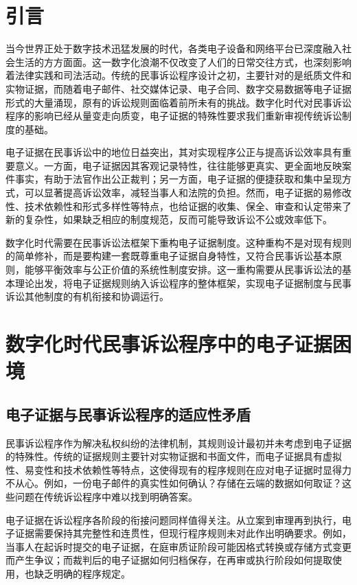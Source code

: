 \section{引言}

当今世界正处于数字技术迅猛发展的时代，各类电子设备和网络平台已深度融入社会生活的方方面面。这一数字化浪潮不仅改变了人们的日常交往方式，也深刻影响着法律实践和司法活动。传统的民事诉讼程序设计之初，主要针对的是纸质文件和实物证据，而随着电子邮件、社交媒体记录、电子合同、数字交易数据等电子证据形式的大量涌现，原有的诉讼规则面临着前所未有的挑战。数字化时代对民事诉讼程序的影响已经从量变走向质变，电子证据的特殊性要求我们重新审视传统诉讼制度的基础。

电子证据在民事诉讼中的地位日益突出，其对实现程序公正与提高诉讼效率具有重要意义。一方面，电子证据因其客观记录特性，往往能够更真实、更全面地反映案件事实，有助于法官作出公正裁判；另一方面，电子证据的便捷获取和集中呈现方式，可以显著提高诉讼效率，减轻当事人和法院的负担。然而，电子证据的易修改性、技术依赖性和形式多样性等特点，也给证据的收集、保全、审查和认定带来了新的复杂性，如果缺乏相应的制度规范，反而可能导致诉讼不公或效率低下。

数字化时代需要在民事诉讼法框架下重构电子证据制度。这种重构不是对现有规则的简单修补，而是要构建一套既尊重电子证据自身特性，又符合民事诉讼基本原则，能够平衡效率与公正价值的系统性制度安排。这一重构需要从民事诉讼法的基本理论出发，将电子证据规则纳入诉讼程序的整体框架，实现电子证据制度与民事诉讼其他制度的有机衔接和协调运行。

\section{数字化时代民事诉讼程序中的电子证据困境}

\subsection{电子证据与民事诉讼程序的适应性矛盾}

民事诉讼程序作为解决私权纠纷的法律机制，其规则设计最初并未考虑到电子证据的特殊性。传统的证据规则主要针对实物证据和书面文件，而电子证据具有虚拟性、易变性和技术依赖性等特点，这使得现有的程序规则在应对电子证据时显得力不从心。例如，一份电子邮件的真实性如何确认？存储在云端的数据如何取证？这些问题在传统诉讼程序中难以找到明确答案。

电子证据在诉讼程序各阶段的衔接问题同样值得关注。从立案到审理再到执行，电子证据需要保持其完整性和连贯性，但现行程序规则未对此作出明确要求。例如，当事人在起诉时提交的电子证据，在庭审质证阶段可能因格式转换或存储方式变更而产生争议；而裁判后的电子证据如何归档保存，在再审或执行阶段如何提取使用，也缺乏明确的程序规定。

